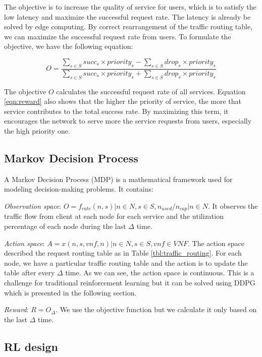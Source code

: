 \documentclass[conference]{IEEEtran}
\begin{document}
The objective is to increase the quality of service for users, which is to satisfy the low latency and maximize the successful request rate. The latency is already be solved by edge computing. By correct rearrangement of the traffic routing table, we can maximize the successful request rate from users. To formulate the objective, we have the following equation: 

\begin{equation}
    \label{eqn:reward}
    O = \frac{\sum_{s \in S} succ_{s} \times priority_{s} - \sum_{s \in S} drop_{s} \times priority_{s}}{\sum_{s \in S} succ_{s} \times priority_{s} + \sum_{s \in S} drop_{s} \times priority_{s}}
\end{equation}

The objective $O$ calculates the successful request rate of all services. Equation \ref{eqn:reward} also shows that the higher the priority of service, the more that service contributes to the total success rate. By maximizing this term, it encourages the network to serve more the service requests from users, especially the high priority one.

\subsection{Markov Decision Process}
\label{subsec:POMDP}
A Markov Decision Process (MDP) is a mathematical framework used for modeling decision-making problems. It contains:

\textit{Observation space}: $O = {f_{rate}(n,s) | n \in N, s \in S}, {n_{used} / n_{cap} | n \in N}$. It observes the traffic flow from client at each node for each service and the utilization percentage of each node during the last $\Delta$ time. 

\textit{Action space}: $A = x(n,s,vnf,n) | n \in N, s \in S, vnf \in VNF$. The action space described the request routing table as in Table \ref{tbl:traffic_routing}. For each node, we have a particular traffic routing table and the action is to update the table after every $\Delta$ time. As we can see, the action space is continuous. This is a challenge for traditional reinforcement learning but it can be solved using DDPG which is presented in the following section.

\textit{Reward}: $R = O_{\Delta}$. We use the objective function but we calculate it only based on the last $\Delta$ time.

\subsection{RL design}
\label{subsec:RL_design}
\end{document}
